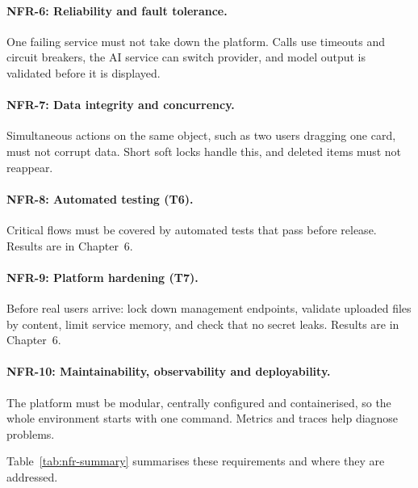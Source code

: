 \documentclass[12pt,a4paper]{report}
\begin{document}
\paragraph{NFR-6: Reliability and fault tolerance.}
One failing service must not take down the platform. Calls use timeouts and circuit breakers, the AI service can switch provider, and model output is validated before it is displayed.

\paragraph{NFR-7: Data integrity and concurrency.}
Simultaneous actions on the same object, such as two users dragging one card, must not corrupt data. Short soft locks handle this, and deleted items must not reappear.

\paragraph{NFR-8: Automated testing (T6).}
Critical flows must be covered by automated tests that pass before release. Results are in Chapter~6.

\paragraph{NFR-9: Platform hardening (T7).}
Before real users arrive: lock down management endpoints, validate uploaded files by content, limit service memory, and check that no secret leaks. Results are in Chapter~6.

\paragraph{NFR-10: Maintainability, observability and deployability.}
The platform must be modular, centrally configured and containerised, so the whole environment starts with one command. Metrics and traces help diagnose problems.


Table~\ref{tab:nfr-summary} summarises these requirements and where they are addressed.
\end{document}
